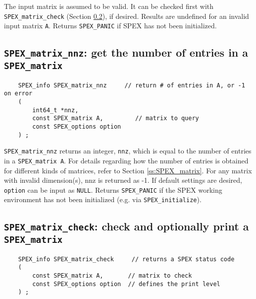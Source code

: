\documentclass[12pt]{report}
\theoremstyle{definition}
\begin{document}
The input matrix is assumed to be valid. It can be checked first with
\verb|SPEX_matrix_check| (Section \ref{s:user:matrix_check}), if desired.
Results are undefined for an invalid input matrix \verb|A|.  Returns
\verb|SPEX_PANIC| if SPEX has not been initialized.

\cprotect\subsection{\verb|SPEX_matrix_nnz|: get the number of entries in a
\verb|SPEX_matrix|}
\label{s:user:matrix_nnz}

\begin{mdframed}[userdefinedwidth=6in]
{\footnotesize
\begin{verbatim}
    SPEX_info SPEX_matrix_nnz     // return # of entries in A, or -1 on error
    (
        int64_t *nnz,
        const SPEX_matrix A,         // matrix to query
        const SPEX_options option
    ) ;
\end{verbatim}
} \end{mdframed}

\verb|SPEX_matrix_nnz| returns an integer, \verb|nnz|, which is equal to the number of entries in a \verb|SPEX_matrix A|.
For details regarding how the number of entries is obtained for different kinds
of matrices, refer to Section \ref{ss:SPEX_matrix}.
For any matrix with invalid dimension(s), nnz is returned as -1.
If default settings are desired, \verb|option| can be input as \verb|NULL|.
Returns \verb|SPEX_PANIC| if the SPEX working environment has not been initialized (e.g. via \verb|SPEX_initialize|).

\cprotect\subsection{\verb|SPEX_matrix_check|: check and optionally print a \verb|SPEX_matrix|}
\label{s:user:matrix_check}

\begin{mdframed}[userdefinedwidth=6in]
{\footnotesize
\begin{verbatim}
    SPEX_info SPEX_matrix_check     // returns a SPEX status code
    (
        const SPEX_matrix A,       // matrix to check
        const SPEX_options option  // defines the print level
    ) ;
\end{verbatim}
} \end{mdframed}
\end{document}

